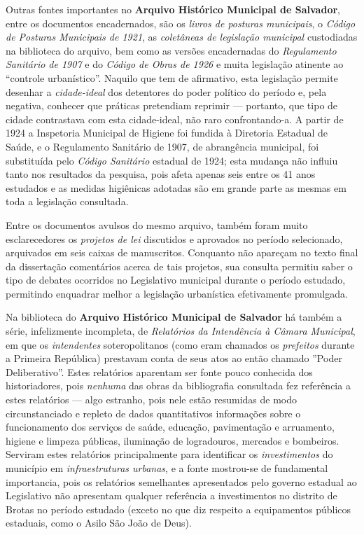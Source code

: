 Outras fontes importantes no \textbf{Arquivo Histórico Municipal de Salvador}, entre os documentos encadernados, são os \textit{livros de posturas municipais}, o \textit{Código de Posturas Municipais de 1921}, as \textit{coletâneas de legislação municipal} custodiadas na biblioteca do arquivo, bem como as versões encadernadas do \textit{Regulamento Sanitário de 1907} e do \textit{Código de Obras de 1926} e muita legislação atinente ao ``controle urbanístico''. Naquilo que tem de afirmativo, esta legislação permite desenhar a \textit{cidade-ideal} dos detentores do poder político do período e, pela negativa, conhecer que práticas pretendiam reprimir --- portanto, que tipo de cidade contrastava com esta cidade-ideal, não raro confrontando-a. A partir de 1924 a Inspetoria Municipal de Higiene foi fundida à Diretoria Estadual de Saúde, e o Regulamento Sanitário de 1907, de abrangência municipal, foi substituída pelo \textit{Código Sanitário} estadual de 1924; esta mudança não influiu tanto nos resultados da pesquisa, pois afeta apenas seis entre os 41 anos estudados e as medidas higiênicas adotadas são em grande parte as mesmas em toda a legislação consultada.

Entre os documentos avulsos do mesmo arquivo, também foram muito esclarecedores os \textit{projetos de lei} discutidos e aprovados no período selecionado, arquivados em seis caixas de manuscritos. Conquanto não apareçam no texto final da dissertação comentários acerca de tais projetos, sua consulta permitiu saber o tipo de debates ocorridos no Legislativo municipal durante o período estudado, permitindo enquadrar melhor a legislação urbanística efetivamente promulgada.

Na biblioteca do \textbf{Arquivo Histórico Municipal de Salvador} há também a série, infelizmente incompleta, de \textit{Relatórios da Intendência à Câmara Municipal}, em que os \textit{intendentes} soteropolitanos (como eram chamados os \textit{prefeitos} durante a Primeira República) prestavam conta de seus atos ao então chamado ''Poder Deliberativo''. Estes relatórios aparentam ser fonte pouco conhecida dos historiadores, pois \textit{nenhuma} das obras da bibliografia consultada fez referência a estes relatórios --- algo estranho, pois nele estão resumidas de modo circunstanciado e repleto de dados quantitativos informações sobre o funcionamento dos serviços de saúde, educação, pavimentação e arruamento, higiene e limpeza públicas, iluminação de logradouros, mercados e bombeiros. Serviram estes relatórios principalmente para identificar os \textit{investimentos} do município em \textit{infraestruturas urbanas}, e a fonte mostrou-se de fundamental importancia, pois os relatórios semelhantes apresentados pelo governo estadual ao Legislativo não apresentam qualquer referência a investimentos no distrito de Brotas no período estudado (exceto no que diz respeito a equipamentos públicos estaduais, como o Asilo São João de Deus).

